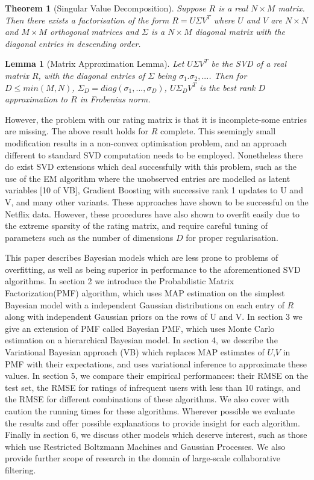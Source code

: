 \documentclass{article}
\theoremstyle{plain}
\newtheorem*{theorem*}{Theorem}
\newtheorem*{lemma*}{Lemma}
\begin{document}
\begin{theorem*}[Singular Value Decomposition]
Suppose $R$ is a real $N \times M$ matrix. Then there exists a factorisation of the form
$R=U\Sigma V^T$ where $U$ and $V$ are $N \times N$ and $M \times M$ orthogonal matrices and $\Sigma$ is a $N \times M$ diagonal matrix with the diagonal entries in descending order.
\end{theorem*}

\begin{lemma*}[Matrix Approximation Lemma]
Let $U\Sigma V^T$ be the SVD of a real matrix $R$, with the diagonal entries of $\Sigma$ being $\sigma_1. \sigma_2, ... $. Then for $D\leq min(M,N) $, $\Sigma_D=diag(\sigma_1,...,\sigma_D)$, $U\Sigma_D V^T$ is the best rank $D$ approximation to $R$ in Frobenius norm.
\end{lemma*}

However, the problem with our rating matrix is that it is incomplete-some entries are missing. The above result holds for $R$ complete. This seemingly small modification results in a non-convex optimisation problem, and an approach different to standard SVD computation needs to be employed. Nonetheless there do exist SVD extensions which deal successfully with this problem, such as the use of the EM algorithm where the unobserved entries are modelled as latent variables [10 of VB], Gradient Boosting with successive rank 1 updates to U and V, and many other variants. These approaches have shown to be successful on the Netflix data. However, these procedures have also shown to overfit easily due to the extreme sparsity of the rating matrix, and require careful tuning of parameters such as the number of dimensions $D$ for proper regularisation.

This paper describes Bayesian models which are less prone to problems of overfitting, as well as being superior in performance to the aforementioned SVD algorithms. In section 2 we introduce the Probabilistic Matrix Factorization(PMF) algorithm, which uses MAP estimation on the simplest Bayesian model with a independent Gaussian distributions on each entry of $R$ along with independent Gaussian priors on the rows of U and V. In section 3 we give an extension of PMF called Bayesian PMF, which uses Monte Carlo estimation on a hierarchical Bayesian model. In section 4, we describe the Variational Bayesian approach (VB) which replaces MAP estimates of $U$,$V$ in PMF with their expectations, and uses variational inference to approximate these values. In section 5, we compare their empirical performances: their RMSE on the test set, the RMSE for ratings of infrequent users with less than 10 ratings, and the RMSE for different combinations of these algorithms. We also cover with caution the running times for these algorithms. Wherever possible we evaluate the results and offer possible explanations to provide insight for each algorithm. Finally in section 6, we discuss other models which deserve interest, such as those which use Restricted Boltzmann Machines and Gaussian Processes. We also provide further scope of research in the domain of large-scale collaborative filtering.
\end{document}
